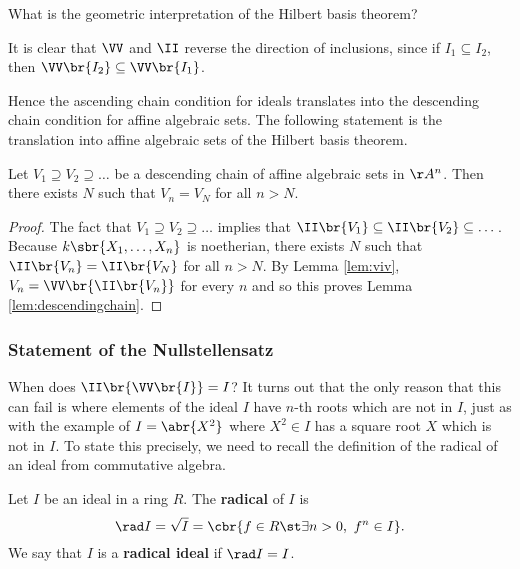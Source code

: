 What is the geometric interpretation of the Hilbert basis theorem?

\begin{note*}
It is clear that $ \VV $ and $ \II $ reverse the direction of inclusions, since if $ I_1 \subseteq I_2 $, then $ \VV\br{I_2} \subseteq \VV\br{I_1} $.
\end{note*}

Hence the ascending chain condition for ideals translates into the descending chain condition for affine algebraic sets. The following statement is the translation into affine algebraic sets of the Hilbert basis theorem.

\begin{lemma}
\label{lem:descendingchain}
Let $ V_1 \supseteq V_2 \supseteq \dots $ be a descending chain of affine algebraic sets in $ \AA^n $. Then there exists $ N $ such that $ V_n = V_N $ for all $ n > N $.
\end{lemma}

\begin{proof}
The fact that $ V_1 \supseteq V_2 \supseteq \dots $ implies that $ \II\br{V_1} \subseteq \II\br{V_2} \subseteq \dots $. Because $ k\sbr{X_1, \dots, X_n} $ is noetherian, there exists $ N $ such that $ \II\br{V_n} = \II\br{V_N} $ for all $ n > N $. By Lemma \ref{lem:viv}, $ V_n = \VV\br{\II\br{V_n}} $ for every $ n $ and so this proves Lemma \ref{lem:descendingchain}.
\end{proof}

\pagebreak

\subsubsection{Statement of the Nullstellensatz}

When does $ \II\br{\VV\br{I}} = I $? It turns out that the only reason that this can fail is where elements of the ideal $ I $ have $ n $-th roots which are not in $ I $, just as with the example of $ I = \abr{X^2} $ where $ X^2 \in I $ has a square root $ X $ which is not in $ I $. To state this precisely, we need to recall the definition of the radical of an ideal from commutative algebra.

\begin{definition*}
Let $ I $ be an ideal in a ring $ R $. The \textbf{radical} of $ I $ is
$$ \rad I = \sqrt{I} = \cbr{f \in R \st \exists n > 0, \ f^n \in I}. $$
We say that $ I $ is a \textbf{radical ideal} if $ \rad I = I $.
\end{definition*}

